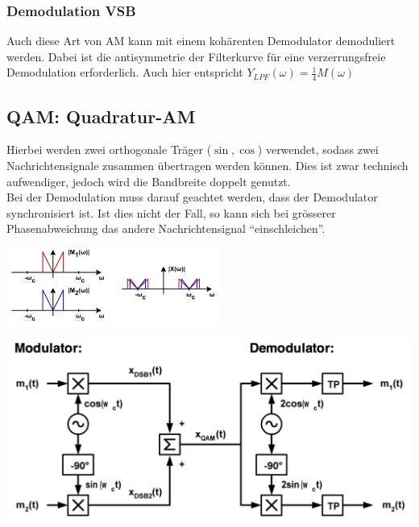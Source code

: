 \subsubsection{Demodulation VSB}
	Auch diese Art von AM kann mit einem kohärenten Demodulator demoduliert werden. Dabei ist die antisymmetrie der Filterkurve für eine verzerrungsfreie Demodulation erforderlich.
	Auch hier entspricht $Y_{LPF}(\omega) = \frac{1}{4}M(\omega)$


\subsection{QAM: Quadratur-AM}
	\begin{minipage}{12cm}
		Hierbei werden zwei orthogonale Träger ($\sin, \cos$) verwendet, sodass zwei Nachrichtensignale zusammen übertragen werden können. Dies ist zwar technisch aufwendiger, jedoch wird die Bandbreite doppelt genutzt. \\
		Bei der Demodulation muss darauf geachtet werden, dass der Demodulator synchronisiert ist. Ist dies nicht der Fall, so kann sich bei grösserer Phasenabweichung das andere Nachrichtensignal ``einschleichen''.
	\end{minipage}
	\begin{minipage}{7cm}
		\includegraphics[width=7cm]{bilder/am_qam_spektrum.png}
	\end{minipage}
	\begin{center}
    	\includegraphics[width=14cm]{bilder/am_qam_modulatorDemodulator.png}
	\end{center}
